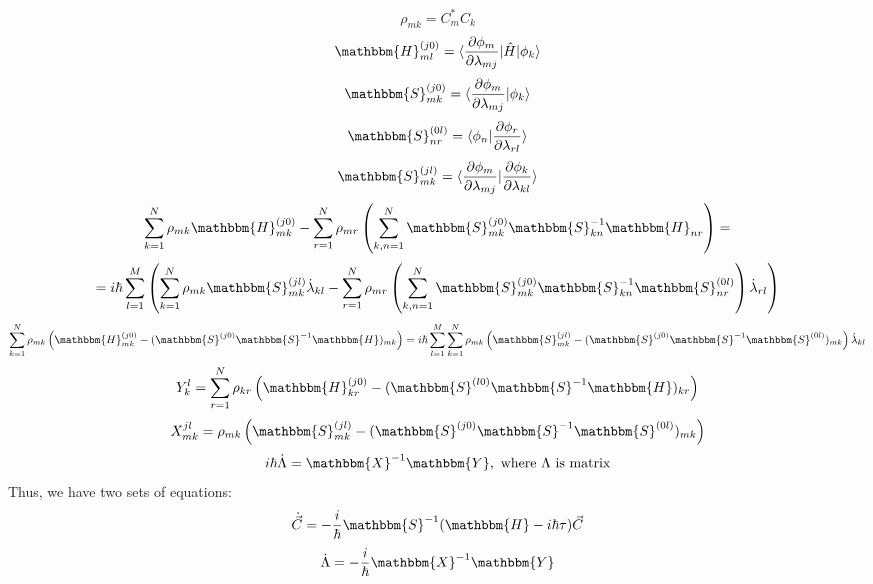 $$\rho_{mk} = C_m^*C_k$$
$$\mathbbm{H}_{ml}^{(j0)}=\langle\frac{\partial\phi_m}{\partial\lambda_{mj}}|\hat{H}|\phi_k\rangle$$
$$\mathbbm{S}_{mk}^{(j0)}=\langle\frac{\partial\phi_m}{\partial\lambda_{mj}}|\phi_k\rangle$$
$$\mathbbm{S}_{nr}^{(0l)}=\langle\phi_n|\frac{\partial\phi_r}{\partial\lambda_{rl}}\rangle$$
$$\mathbbm{S}_{mk}^{(jl)}=\langle\frac{\partial\phi_m}{\partial\lambda_{mj}}|%
				 \frac{\partial\phi_k}{\partial\lambda_{kl}}\rangle$$
$$\sum_{k=1}^N\rho_{mk}\mathbbm{H}_{mk}^{(j0)}-%
  \sum_{r=1}^N\rho_{mr}\left(\sum_{k,n=1}^N\mathbbm{S}_{mk}^{(j0)}\mathbbm{S}_{kn}^{-1}\mathbbm{H}_{nr}\right)=$$
$$=i\hbar\sum_{l=1}^M\left(\sum_{k=1}^N\rho_{mk}\mathbbm{S}_{mk}^{(jl)}\dot{\lambda}_{kl}-%
\sum_{r=1}^N\rho_{mr}\left(\sum_{k,n=1}^{N}\mathbbm{S}_{mk}^{(j0)}\mathbbm{S}_{kn}^{-1}\mathbbm{S}_{nr}^{(0l)}\right)\dot{\lambda}_{rl}\right)$$
$$\sum_{k=1}^N\rho_{mk}\left(\mathbbm{H}_{mk}^{(j0)}-%
	                     (\mathbbm{S}^{(j0)}\mathbbm{S}^{-1}\mathbbm{H})_{mk} \right)=%
i\hbar\sum_{l=1}^M\sum_{k=1}^N\rho_{mk}\left(\mathbbm{S}_{mk}^{(jl)}-%
					     (\mathbbm{S}^{(j0)}\mathbbm{S}^{-1}\mathbbm{S}^{(0l)})_{mk}\right)\dot{\lambda}_{kl}$$
$$Y_{k}^l=\sum_{r=1}^N\rho_{kr}\left(\mathbbm{H}_{kr}^{(j0)}-%
	                     (\mathbbm{S}^{(l0)}\mathbbm{S}^{-1}\mathbbm{H})_{kr} \right)$$
$$X_{mk}^{jl}=\rho_{mk}\left(\mathbbm{S}_{mk}^{(jl)}-%
					     (\mathbbm{S}^{(j0)}\mathbbm{S}^{-1}\mathbbm{S}^{(0l)})_{mk}\right)$$
$$i\hbar\dot{\Lambda} = \mathbbm{X}^{-1}\mathbbm{Y},\text{ where }\Lambda\text{ is matrix}$$
Thus, we have two sets of equations:
$$\dot{\vec{C}} = -\frac{i}{\hbar}\mathbbm{S}^{-1}(\mathbbm{H}-i\hbar\tau)\vec{C}$$
$$\dot{\Lambda} = -\frac{i}{\hbar}\mathbbm{X}^{-1}\mathbbm{Y}$$

